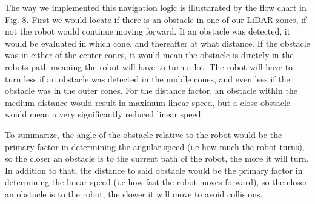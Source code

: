 \documentclass[conference]{IEEEtran}
\begin{document}
The way we implemented this navigation logic is illustarated by the flow chart in \href{sec:flowchart}{Fig. 8}. 
First we would locate if there is an obstacle in one of our LiDAR zones, if not the robot would continue moving forward.
If an obstacle was detected, it would be evaluated in which cone, and thereafter at what distance.
If the obstacle was in either of the center cones, it would mean the obstacle is diretcly in the robots path meaning the robot will have to turn a lot.
The robot will have to turn less if an obstacle was detected in the middle cones, and even less if the obstacle was in the outer cones.
For the distance factor, an obstacle within the medium distance would result in maximum linear speed, but a close obstacle would mean a very significantly reduced linear speed.

To summarize, the angle of the obstacle relative to the robot would be the primary factor in determining the angular speed (i.e how much the robot turns), so the closer an obstacle is to the current path of the robot, the more it will turn.
In addition to that, the distance to said obstacle would be the primary factor in determining the linear speed (i.e how fast the robot moves forward), so the closer an obstacle is to the robot, the slower it will move to avoid collisions.
\end{document}
